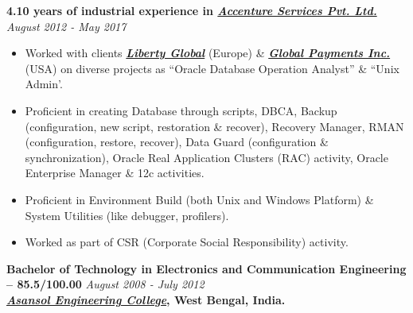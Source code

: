 \documentclass[9pt]{article}
\newenvironment{changemargin}[2]{%
  \begin{list}{}{%
    \setlength{\topsep}{0pt}%
    \setlength{\leftmargin}{#1}%
    \setlength{\rightmargin}{#2}%
    \setlength{\listparindent}{\parindent}%
    \setlength{\itemindent}{\parindent}%
    \setlength{\parsep}{\parskip}%
  }%
  \item[]}{\end{list}
}
\newenvironment{body} {
	\vspace*{-16pt}
	\begin{changemargin}{-0.25in}{-0.5in}
  }
	{\end{changemargin}
}
\begin{document}
\begin{body}
	\vspace{14pt}

	\textbf{4.10 years of industrial experience in  {\emph{\href{https://www.accenture.com/in-en/accenture-services-private-limited}{Accenture Services Pvt. Ltd.}}}} \hfill \emph{August 2012 - May 2017} \\
	\begin{itemize} \itemsep -0pt
            \item  Worked with clients \textbf{\emph{\href{http://www.libertyglobal.com}{Liberty Global}}} (Europe) \& \textbf{\emph{\href{https://www.globalpaymentsinc.com/en-us}{Global Payments Inc.}}} (USA) on diverse projects as ``Oracle Database Operation Analyst'' \& ``Unix Admin'.
            \item Proficient in creating Database through scripts, DBCA, Backup (configuration, new
script, restoration \& recover), Recovery Manager, RMAN (configuration, restore,
recover), Data Guard (configuration \& synchronization), Oracle Real Application
Clusters (RAC) activity, Oracle Enterprise Manager \& 12c activities.
            \item Proficient in Environment Build (both Unix and Windows Platform) \& System Utilities
(like debugger, profilers).
            \item Worked as part of CSR (Corporate Social Responsibility) activity.
        \end{itemize}

  \medskip
	\textbf{Bachelor of Technology in Electronics and Communication Engineering -- 85.5/100.00} \hfill \emph{August 2008 - July 2012} \\
	\textbf{\emph{\href{http://www.aecwb.edu.in/index.php/}{Asansol Engineering College}}, West Bengal, India.}\\
\end{body}

\smallskip
\end{document}
